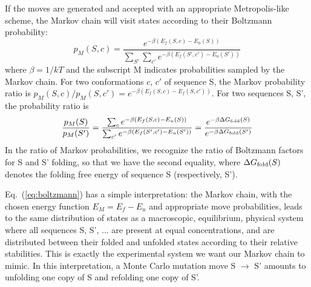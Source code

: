 \documentclass[a4paper,12pt]{article}
\begin{document}
If the moves are generated and accepted with an appropriate Metropolis-like scheme, the Markov chain will
visit states according to their Boltzmann probability: 
\begin{equation}  \label{eq:proba}
p_M(S,c) = \frac{ e^{-\beta(E_f(S,c)-E_u(S))} }{ \sum_{S'} \sum_{c'} e^{-\beta(E_f(S',c')-E_u(S'))} }
\end{equation}
where $\beta =1/kT$ and the subscript M indicates probabilities sampled by the Markov chain. For two conformations
$c$, $c'$ of sequence S, the Markov probability ratio is $p_M(S,c)/p_M(S,c') = e^{-\beta (E_f(S,c)-E_f(S,c'))}$. For two
sequences S, S', the probability ratio is
\begin{equation}  \label{eq:boltzmann}
\frac{p_M(S)}{p_M(S')} = \frac{ \sum_c e^{-\beta (E_f(S,c)-E_u(S))} }
                             { \sum_{c'} e^{-\beta(E_f(S',c')-E_u(S'))} }
                      = \frac{ e^{-\beta \Delta G_{\rm fold}(S)}}{e^{-\beta \Delta G_{\rm fold}(S')}}
\end{equation}
In the ratio of Markov probabilities, we recognize the ratio of Boltzmann factors for S and S' folding, so that we
have the second equality, where $\Delta G_{\rm fold}(S)$ denotes the folding free energy of sequence S (respectively, S').

Eq.\ (\ref{eq:boltzmann}) has a simple interpretation: the Markov chain, with the chosen energy function $E_M =
E_f - E_u$ and appropriate move probabilities, leads to the same distribution of states as a macroscopic, equilibrium,
physical system where all sequences S, S', ... are present at equal concentrations, and are distributed between their
folded and unfolded states according to their relative stabilities. This is exactly the experimental system we want
our Markov chain to mimic. In this interpretation, a Monte Carlo mutation move S $\rightarrow$ S' amounts to unfolding
one copy of S and refolding one copy of S'.
\end{document}
